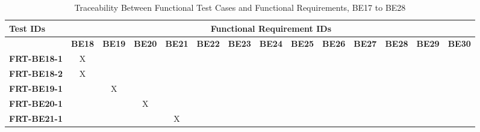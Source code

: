 \documentclass[12pt, titlepage]{article}
\begin{document}
\begin{landscape}
	\begin{longtable}{|l|ccccccccccccc|}
		\caption{Traceability Between Functional Test Cases and Functional Requirements, BE17 to BE28}                                                                                                                                                                                  \\
		\hline
		\textbf{Test IDs}   & \multicolumn{13}{c|}{\textbf{Functional Requirement IDs}}                                                                                                                                                                                                 \\
		\hline
		~                   & \textbf{BE18}                                             & \textbf{BE19} & \textbf{BE20} & \textbf{BE21} & \textbf{BE22} & \textbf{BE23} & \textbf{BE24} & \textbf{BE25} & \textbf{BE26} & \textbf{BE27} & \textbf{BE28} & \textbf{BE29} & \textbf{BE30} \\
		\hline
		\textbf{FRT-BE18-1} & X                                                         & ~             & ~             & ~             & ~             & ~             & ~             & ~             & ~             & ~             & ~             & ~             & ~             \\
		\textbf{FRT-BE18-2} & X                                                         & ~             & ~             & ~             & ~             & ~             & ~             & ~             & ~             & ~             & ~             & ~             & ~             \\
		\textbf{FRT-BE19-1} & ~                                                         & X             & ~             & ~             & ~             & ~             & ~             & ~             & ~             & ~             & ~             & ~             & ~             \\
		\textbf{FRT-BE20-1} & ~                                                         & ~             & X             & ~             & ~             & ~             & ~             & ~             & ~             & ~             & ~             & ~             & ~             \\
		\textbf{FRT-BE21-1} & ~                                                         & ~             & ~             & X             & ~             & ~             & ~             & ~             & ~             & ~             & ~             & ~             & ~             \\

\end{longtable}
\end{landscape}
\end{document}
